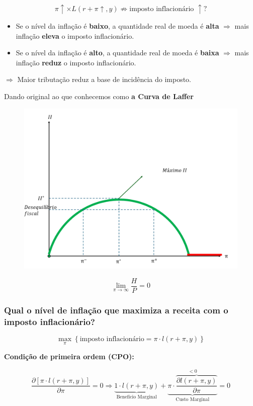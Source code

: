 \documentclass[a4paper,12pt]{article}[abntex2]
\begin{document}
\[
\pi \uparrow \times L(r + \pi \uparrow, y) \not\Rightarrow \text{imposto inflacionário } \uparrow ?
\]

\begin{itemize}
    \item Se o nível da inflação é \textbf{baixo}, a quantidade real de moeda é \textbf{alta} \(\Rightarrow\) mais inflação \textbf{eleva} o imposto inflacionário.
    \item Se o nível da inflação é \textbf{alto}, a quantidade real de moeda é \textbf{baixa} \(\Rightarrow\) mais inflação \textbf{reduz} o imposto inflacionário.
\end{itemize}

\(\Rightarrow\) Maior tributação reduz a base de incidência do imposto.

Dando original ao que conhecemos como \textbf{a Curva de Laffer}

\begin{figure}[H]
    \centering
    \includegraphics[width=0.7\linewidth]{Imagens/a20i3.png}
\end{figure}
\[
\lim_{\pi\to\infty}\frac{H}{P}=0
\]

\subsubsection{\textbf{Qual o nível de inflação que maximiza a receita com o imposto inflacionário?}}

\[
\max_{\pi} \left\{ \text{imposto inflacionário} = \pi \cdot l(r + \pi, y) \right\}
\]

\textbf{Condição de primeira ordem (CPO):}

\[
\frac{\partial \left[ \pi \cdot l(r + \pi, y) \right]}{\partial \pi} = 0
\Rightarrow \underbrace{1\cdot l(r + \pi, y)}_{\text{Benefício Marginal}} + \underbrace{\pi \cdot \overbrace{\frac{\partial l(r + \pi, y)}{\partial \pi}}}^{<0}_{\text{Custo Marginal}} = 0
\]
\end{document}
